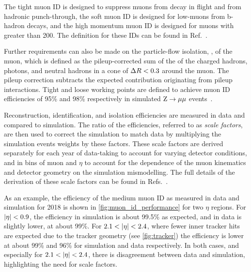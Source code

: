 The tight muon ID is designed to suppress muons from decay in flight and from hadronic punch-through, the soft muon ID is designed for low-\pt muons from b-hadron decays, and the high momentum muon ID is designed for muons with \pt greater than 200\GeV. The definition for these IDs can be found in Ref.~\cite{CMS:2018rym}. 

Further requirements can also be made on the particle-flow isolation, \IPF, of the muon, which is defined as the pileup-corrected sum of the \pt of the charged hadrons, photons, and neutral hadrons in a cone of $\Delta R < 0.3$ around the muon. The pileup correction subtracts the expected contribution originating from pileup interactions. Tight and loose working points are defined to achieve muon ID efficiencies of 95\% and 98\% respectively in simulated $\mathrm{Z}\to\mu\mu$ events~\cite{CMS:2018rym}.

Reconstruction, identification, and isolation efficiencies are measured in data and compared to simulation. The ratio of the efficiencies, referred to as \textit{scale factors}, are then used to correct the simulation to match data by multiplying the simulation events weights by these factors. These scale factors are derived separately for each year of data-taking to account for varying detector conditions, and in bins of muon \pt and $\eta$ to account for the dependence of the muon kinematics and detector geometry on the simulation mismodelling. The full details of the derivation of these scale factors can be found in Refs.~\cite{CMS:2018rym,CMS:2019ied,CMS-DP-2017-007,CMS-DP-2018-042,CMS-DP-2019-022,CMS-DP-2020-040}. 

As an example, the efficiency of the medium muon ID as measured in data and simulation for 2018 is shown in \cref{fig:muon_id_performance} for two $\eta$ regions. For $\lvert \eta \rvert < 0.9$, the efficiency in simulation is about 99.5\% as expected, and in data is slightly lower, at about 99\%. For $2.1 < \lvert \eta \rvert < 2.4$, where fewer inner tracker hits are expected due to the tracker geometry (see \cref{fig:tracker}) the efficiency is lower at about 99\% and 96\% for simulation and data respectively. In both cases, and especially for $2.1 < \lvert \eta \rvert < 2.4$, there is disagreement between data and simulation, highlighting the need for scale factors.

